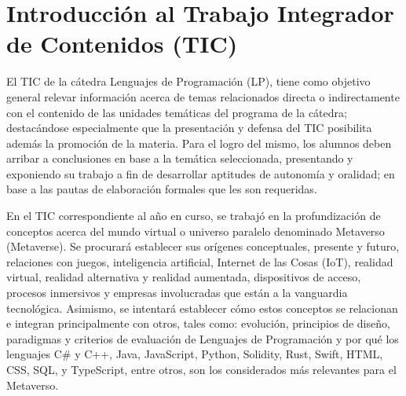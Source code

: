 \documentclass[a4paper,10pt]{article}
\begin{document}
		\section{Introducción al Trabajo Integrador de Contenidos (TIC)}
		{\normalsize El TIC de la cátedra Lenguajes de Programación (LP), tiene como objetivo general relevar información acerca de temas relacionados directa o indirectamente con el contenido de las unidades temáticas del programa de la cátedra; destacándose especialmente que la presentación y defensa del TIC posibilita además la promoción de la materia. Para el logro del mismo, los alumnos deben arribar a conclusiones en base a la temática seleccionada, presentando y exponiendo su trabajo a fin de desarrollar aptitudes de autonomía y oralidad; en base a las pautas de elaboración formales que les son requeridas.\par 
		En el TIC correspondiente al año en curso, se trabajó en la profundización de conceptos acerca del mundo virtual o universo paralelo denominado Metaverso (Metaverse). Se procurará establecer sus orígenes conceptuales, presente y futuro, relaciones con juegos, inteligencia artificial, Internet de las Cosas (IoT), realidad virtual, realidad alternativa y realidad aumentada, dispositivos de acceso, procesos inmersivos y empresas involucradas que están a la vanguardia tecnológica. Asimismo, se intentará establecer cómo estos conceptos se relacionan e integran principalmente con otros, tales como: evolución, principios de diseño, paradigmas y criterios de evaluación de Lenguajes de Programación y por qué los lenguajes C\# y C++, Java, JavaScript, Python, Solidity, Rust, Swift, HTML, CSS, SQL, y TypeScript, entre otros, son los considerados más relevantes para el Metaverso.}
\end{document}
